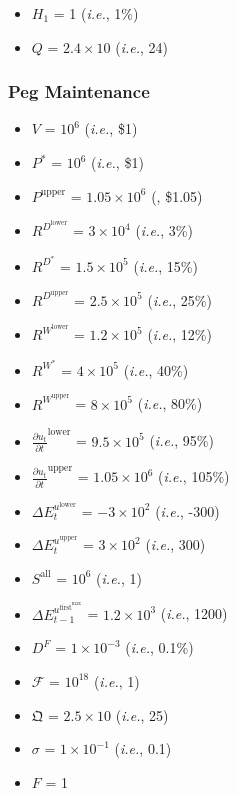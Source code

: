 \documentclass[class=article, crop=false]{standalone}
\begin{document}
\begin{itemize}[topsep=0pt, itemsep=3pt,leftmargin=16pt]
    \item $H_{1}$ = 1 (\textit{i.e.}, 1\%)
    \item $Q$ = $2.4 \times 10$ (\textit{i.e.}, 24)
\end{itemize}


\subsubsection{Peg Maintenance}

\begin{itemize}[topsep=0pt, itemsep=3pt,leftmargin=16pt]
    \item $V$ = $10^{6}$ (\textit{i.e.}, \$1)
    \item $P^{*}$ = $10^{6}$ (\textit{i.e.}, \$1)
    \item $P^{\text{upper}}$ = $1.05 \times 10^{6}$ (, \$1.05)
    \item $R^{D^{\text{lower}}}$ = $3 \times 10^{4}$ (\textit{i.e.}, 3\%)
    \item $R^{D^{*}}$ = $1.5 \times 10^{5}$ (\textit{i.e.}, 15\%)
    \item $R^{D^{\text{upper}}}$ = $2.5 \times 10^{5}$ (\textit{i.e.}, 25\%)
    \item $R^{W^{\text{lower}}}$ = $1.2 \times 10^{5}$ (\textit{i.e.}, 12\%)
    \item $R^{W^{*}}$ = $4 \times 10^{5}$ (\textit{i.e.}, 40\%)
    \item $R^{W^{\text{upper}}}$ = $8 \times 10^{5}$ (\textit{i.e.}, 80\%)
    \item $\frac{\partial u_{t}}{\partial t}^{\text{lower}}$ = $9.5 \times 10^{5}$ (\textit{i.e.}, 95\%)
    \item $\frac{\partial u_{t}}{\partial t}^{\text{upper}}$ = $1.05 \times 10^{6}$ (\textit{i.e.}, 105\%)
    \item $\Delta E_{t}^{u^{\text{lower}}}$ = $-3 \times 10^{2}$ (\textit{i.e.}, -300)
    \item $\Delta E_{t}^{u^{\text{upper}}}$ = $3 \times 10^{2}$ (\textit{i.e.}, 300)
    \item $S^{\text{all}}$ = $10^{6}$ (\textit{i.e.}, 1)
    \item $\Delta E_{t-1}^{u^{\text{first}^{\text{max}}}}$ = $1.2 \times 10^{3}$ (\textit{i.e.}, 1200)
    \item $D^{F}$ = $1 \times 10^{-3}$ (\textit{i.e.}, 0.1\%)
    \item $\mathscr{F}$ = $10^{18}$ (\textit{i.e.}, 1)
    \item $\mathfrak{Q}$ = $2.5 \times 10$ (\textit{i.e.}, 25)
    \item $\sigma$ = $1 \times 10^{-1}$ (\textit{i.e.}, 0.1)
    \item $F$ = 1
\end{itemize}
\end{document}

